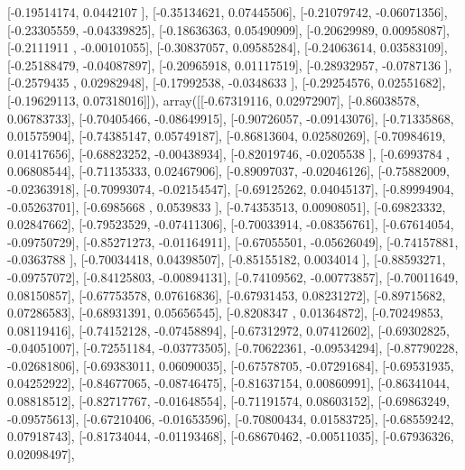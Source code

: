 \documentclass{article}
\begin{document}
       [-0.19514174,  0.0442107 ],
       [-0.35134621,  0.07445506],
       [-0.21079742, -0.06071356],
       [-0.23305559, -0.04339825],
       [-0.18636363,  0.05490909],
       [-0.20629989,  0.00958087],
       [-0.2111911 , -0.00101055],
       [-0.30837057,  0.09585284],
       [-0.24063614,  0.03583109],
       [-0.25188479, -0.04087897],
       [-0.20965918,  0.01117519],
       [-0.28932957, -0.0787136 ],
       [-0.2579435 ,  0.02982948],
       [-0.17992538, -0.0348633 ],
       [-0.29254576,  0.02551682],
       [-0.19629113,  0.07318016]]), array([[-0.67319116,  0.02972907],
       [-0.86038578,  0.06783733],
       [-0.70405466, -0.08649915],
       [-0.90726057, -0.09143076],
       [-0.71335868,  0.01575904],
       [-0.74385147,  0.05749187],
       [-0.86813604,  0.02580269],
       [-0.70984619,  0.01417656],
       [-0.68823252, -0.00438934],
       [-0.82019746, -0.0205538 ],
       [-0.6993784 ,  0.06808544],
       [-0.71135333,  0.02467906],
       [-0.89097037, -0.02046126],
       [-0.75882009, -0.02363918],
       [-0.70993074, -0.02154547],
       [-0.69125262,  0.04045137],
       [-0.89994904, -0.05263701],
       [-0.6985668 ,  0.0539833 ],
       [-0.74353513,  0.00908051],
       [-0.69823332,  0.02847662],
       [-0.79523529, -0.07411306],
       [-0.70033914, -0.08356761],
       [-0.67614054, -0.09750729],
       [-0.85271273, -0.01164911],
       [-0.67055501, -0.05626049],
       [-0.74157881, -0.0363788 ],
       [-0.70034418,  0.04398507],
       [-0.85155182,  0.0034014 ],
       [-0.88593271, -0.09757072],
       [-0.84125803, -0.00894131],
       [-0.74109562, -0.00773857],
       [-0.70011649,  0.08150857],
       [-0.67753578,  0.07616836],
       [-0.67931453,  0.08231272],
       [-0.89715682,  0.07286583],
       [-0.68931391,  0.05656545],
       [-0.8208347 ,  0.01364872],
       [-0.70249853,  0.08119416],
       [-0.74152128, -0.07458894],
       [-0.67312972,  0.07412602],
       [-0.69302825, -0.04051007],
       [-0.72551184, -0.03773505],
       [-0.70622361, -0.09534294],
       [-0.87790228, -0.02681806],
       [-0.69383011,  0.06090035],
       [-0.67578705, -0.07291684],
       [-0.69531935,  0.04252922],
       [-0.84677065, -0.08746475],
       [-0.81637154,  0.00860991],
       [-0.86341044,  0.08818512],
       [-0.82717767, -0.01648554],
       [-0.71191574,  0.08603152],
       [-0.69863249, -0.09575613],
       [-0.67210406, -0.01653596],
       [-0.70800434,  0.01583725],
       [-0.68559242,  0.07918743],
       [-0.81734044, -0.01193468],
       [-0.68670462, -0.00511035],
       [-0.67936326,  0.02098497],
\end{document}
